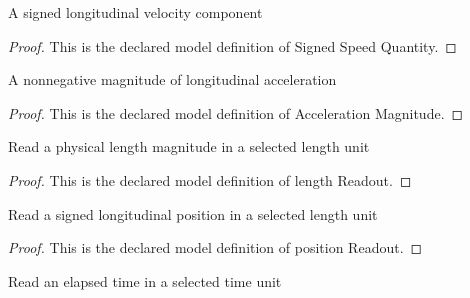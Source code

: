 \begin{definition}
  \label{def:physics:phyx-mini-0730:phyxminiproblems-problemphyxmini0730-signedspeedquantity}
  A signed longitudinal velocity component
\end{definition}
\begin{proof}
  This is the declared model definition of Signed Speed Quantity.
\end{proof}
\begin{definition}
  \label{def:physics:phyx-mini-0730:phyxminiproblems-problemphyxmini0730-accelerationmagnitude}
  A nonnegative magnitude of longitudinal acceleration
\end{definition}
\begin{proof}
  This is the declared model definition of Acceleration Magnitude.
\end{proof}
\begin{definition}
  \label{def:physics:phyx-mini-0730:phyxminiproblems-problemphyxmini0730-lengthreadout}
  Read a physical length magnitude in a selected length unit
\end{definition}
\begin{proof}
  This is the declared model definition of length Readout.
\end{proof}
\begin{definition}
  \label{def:physics:phyx-mini-0730:phyxminiproblems-problemphyxmini0730-positionreadout}
  Read a signed longitudinal position in a selected length unit
\end{definition}
\begin{proof}
  This is the declared model definition of position Readout.
\end{proof}
\begin{definition}
  \label{def:physics:phyx-mini-0730:phyxminiproblems-problemphyxmini0730-timereadout}
  Read an elapsed time in a selected time unit
\end{definition}
